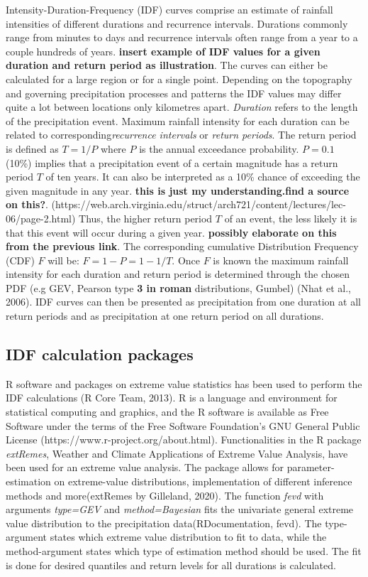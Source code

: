 Intensity-Duration-Frequency (IDF) curves comprise an estimate of rainfall intensities of different durations and recurrence intervals. Durations commonly range from minutes to days and recurrence intervals often range from a year to a couple hundreds of years. \textbf{insert example of IDF values for a given duration and return period as illustration}. The curves can either be calculated for a large region or for a single point. Depending on the topography and governing precipitation processes and patterns the IDF values may differ quite a lot between locations only kilometres apart. \textit{Duration} refers to the length of the precipitation event. Maximum rainfall intensity for each duration can be related to corresponding\textit{recurrence intervals} or \textit{return periods}. The return period is defined as $T = 1/P$ where $P$ is the annual exceedance probability. $P = 0.1$  (10\%)  implies that a precipitation event of a certain magnitude has a return period $T$ of ten years. It can also be interpreted as a 10\% chance of exceeding the given magnitude in any year. \textbf{this is just my understanding.find a source on this?}. (https://web.arch.virginia.edu/struct/arch721/content/lectures/lec-06/page-2.html) Thus, the higher return period $T$ of an event, the less likely it is that this event will occur during a given year. \textbf{possibly elaborate on this from the previous link}. The corresponding cumulative Distribution Frequency (CDF) $F$ will be: $F = 1-P = 1-1/T$. Once $F$ is known the maximum rainfall intensity for each duration and return period is determined through the chosen PDF (e.g GEV, Pearson type \textbf{3 in roman} distributions, Gumbel) (Nhat et al., 2006). IDF curves can then be presented as precipitation from one duration at all return periods and as precipitation at one return period on all durations. 


\subsection{IDF calculation packages}

R software and packages on extreme value statistics has been used to perform the IDF calculations (R Core Team, 2013). R is a language and environment for statistical computing and graphics, and the R software is available as Free Software under the terms of the Free Software Foundation's GNU General Public License (https://www.r-project.org/about.html). Functionalities in the R package \textit{extRemes}, Weather and Climate Applications of Extreme Value Analysis, have been used for an extreme value analysis. The package allows for parameter-estimation on extreme-value distributions, implementation of different inference methods and more(extRemes by Gilleland, 2020). The function \textit{fevd} with arguments \textit{type=GEV} and \textit{method=Bayesian} fits the univariate general extreme value distribution to the precipitation data(RDocumentation, fevd). The type-argument states which extreme value distribution to fit to data, while the method-argument states which type of estimation method should be used. The fit is done for desired quantiles and return levels for all durations is calculated.  

